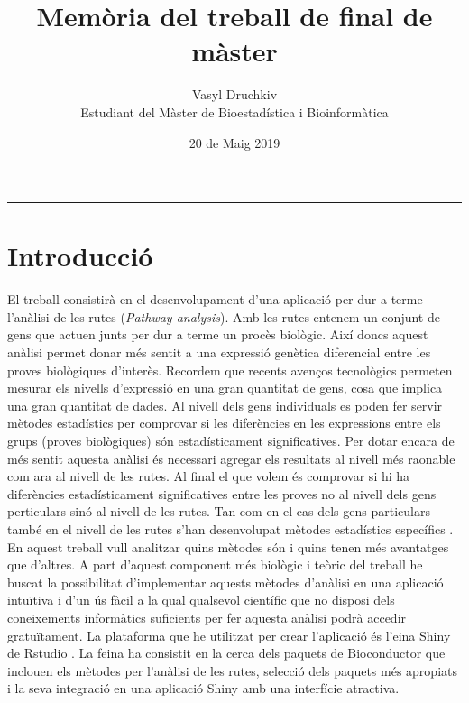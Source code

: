 \documentclass[]{article}
\title{Memòria del treball de final de màster}
\date{20 de Maig 2019}
\author{Vasyl Druchkiv \\ Estudiant del Màster de Bioestadística i Bioinformàtica}
\begin{document}
\maketitle
\thispagestyle{empty}
\makeatletter
\makeatother
\newpage
\begin{spacing}{0.1}
\tableofcontents
\end{spacing}
\thispagestyle{empty}

\begin{center}
\noindent\rule{8cm}{0.4pt}
\end{center}

\newpage

\clearpage 
{} 
\section{Introducció}

El treball consistirà en el desenvolupament d'una aplicació per dur a terme l'anàlisi de les rutes (\textit{Pathway analysis}). Amb les rutes entenem un conjunt de gens que actuen junts per dur a terme un procès biològic. Així doncs aquest anàlisi permet donar més sentit a una expressió genètica diferencial entre les proves biològiques d'interès. Recordem que recents avenços tecnològics permeten mesurar els nivells d'expressió en una gran quantitat de gens, cosa que implica una gran quantitat de dades. Al nivell dels gens individuals es poden fer servir mètodes estadístics per comprovar si les diferències en les expressions entre els grups (proves biològiques) són estadísticament significatives. Per dotar encara de més sentit aquesta anàlisi és necessari agregar els resultats al nivell més raonable com ara al nivell de les rutes. Al final el que volem és comprovar si hi ha diferències estadísticament significatives entre les proves no al nivell dels gens perticulars sinó al nivell de les rutes. Tan com en el cas dels gens particulars també en el nivell de les rutes s'han desenvolupat mètodes estadístics específics \cite{khatri2012ten}. En aquest treball vull analitzar quins mètodes són i quins tenen més avantatges que d'altres. A part d'aquest component més biològic i teòric del treball he buscat la possibilitat d'implementar aquests mètodes d'anàlisi en una aplicació intuïtiva i d'un ús fàcil a la qual qualsevol científic que no disposi dels coneixements informàtics suficients per fer aquesta anàlisi podrà accedir gratuïtament. La plataforma que he utilitzat per crear l'aplicació és l'eina Shiny de Rstudio \cite{Shiny}.  La feina ha consistit en la cerca dels paquets de Bioconductor que inclouen els mètodes per l'anàlisi de les rutes, selecció dels paquets més apropiats i la seva integració en una aplicació Shiny amb una interfície atractiva. 
\end{document}
